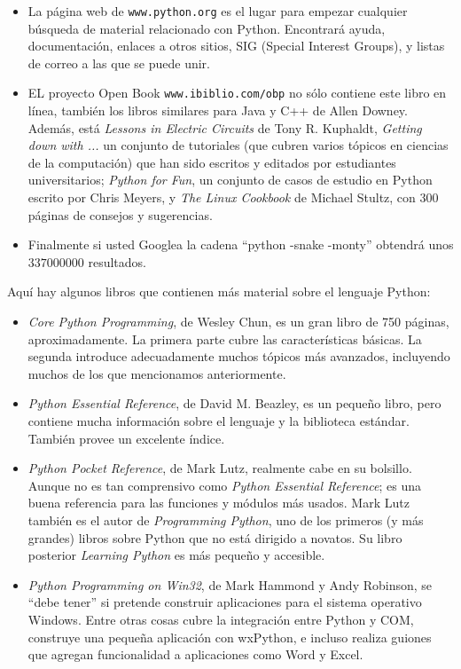 \begin{itemize}

\item La página web de  \texttt{www.python.org} es el lugar para
empezar cualquier búsqueda de material relacionado con Python.  Encontrará
ayuda, documentación, enlaces a otros sitios, SIG (Special Interest
Groups), y listas de correo a las que se puede unir.

\item EL proyecto Open Book \texttt{www.ibiblio.com/obp} no sólo contiene
este libro en línea, también los libros similares para Java y 
C++ de Allen Downey. Además, está {\em Lessons in Electric Circuits} de Tony R.  Kuphaldt, {\em Getting down with ...} un conjunto de tutoriales (que cubren varios
tópicos en ciencias de la computación) que han sido escritos y editados por 
estudiantes universitarios; {\em Python for Fun}, un conjunto
de casos de estudio en Python escrito por  Chris Meyers, y  {\em The Linux
Cookbook} de Michael Stultz, con 300 páginas de consejos y sugerencias.

\item Finalmente si usted Googlea la cadena ``python -snake -monty'' obtendrá
 unos $337000000$ resultados.

\end{itemize}


Aquí hay algunos libros que contienen más material sobre el lenguaje
Python:

\begin{itemize}

\item {\em Core Python Programming}, de Wesley Chun, es un gran libro
de 750 páginas, aproximadamente. La primera parte cubre las características
básicas. La segunda introduce adecuadamente muchos tópicos más avanzados,
incluyendo muchos de los que mencionamos anteriormente.

\item {\em Python Essential Reference}, de David M. Beazley, es un 
pequeño libro, pero contiene mucha información sobre el lenguaje
y la biblioteca estándar. También provee un excelente índice.

\item {\em Python Pocket Reference}, de Mark Lutz, realmente cabe 
en su bolsillo. Aunque no es tan comprensivo como {\em Python Essential
Reference}; es una buena referencia para las funciones y módulos más
usados.  Mark Lutz también es el autor de {\em Programming Python},
uno de los primeros (y más grandes) libros sobre Python que no está
dirigido a novatos. Su libro posterior {\em Learning Python} es más
pequeño y accesible.

\item {\em Python Programming on Win32}, de Mark Hammond y Andy
Robinson, se ``debe tener'' si pretende construir aplicaciones
para el sistema operativo Windows. Entre otras cosas cubre la
integración entre Python y COM, construye una pequeña aplicación con
 wxPython, e incluso realiza guiones que agregan funcionalidad
a aplicaciones como Word y Excel.

\end{itemize}

